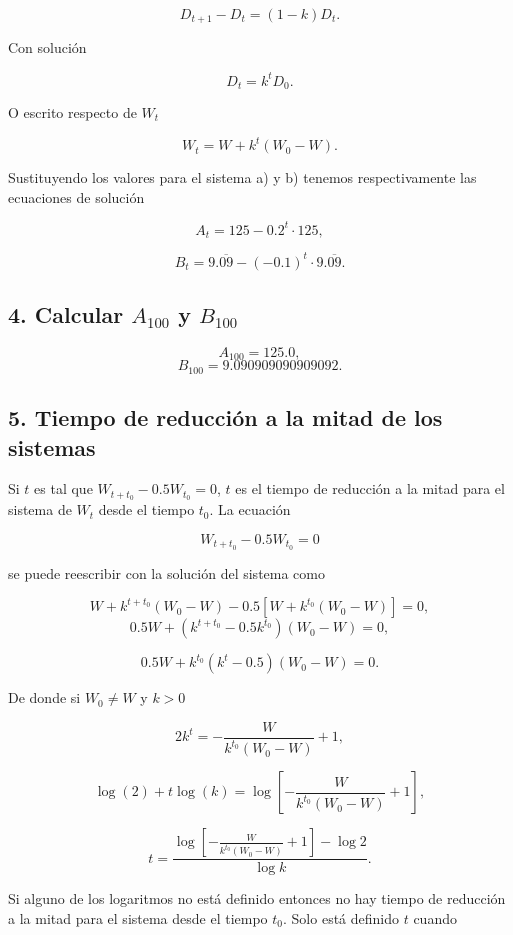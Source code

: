 \documentclass[11pt]{article}
\begin{document}
\[D_{t+1}-D_t = (1-k) D_t.\]

Con solución

\[D_t = k^t D_0.\]

O escrito respecto de \(W_t\)

\[W_t = W+ k^t (W_0-W).\]

    Sustituyendo los valores para el sistema a) y b) tenemos respectivamente
las ecuaciones de solución

\[A_t = 125- 0.2^t \cdot 125,\]

\[B_t = 9.\overline{09}- (-0.1)^t \cdot9.\overline{09}.\]

    \hypertarget{calcular-a_100-y-b_100}{%
\subsection*{\texorpdfstring{4. Calcular \(A_{100}\) y
\(B_{100}\)}{4. Calcular A\_\{100\} y B\_\{100\}}}\label{calcular-a_100-y-b_100}}

    \[A_{100} =125.0,\] \[B_{100} =9.090909090909092.\]

    \hypertarget{tiempo-de-reducciuxf3n-a-la-mitad-de-los-sistemas}{%
\subsection*{5. Tiempo de reducción a la mitad de los
sistemas}\label{tiempo-de-reducciuxf3n-a-la-mitad-de-los-sistemas}}

    Si \(t\) es tal que \(W_{t+t_0}-0.5 W_{t_0}=0\), \(t\) es el tiempo de
reducción a la mitad para el sistema de \(W_t\) desde el tiempo \(t_0\).
La ecuación

\[W_{t+t_0}-0.5 W_{t_0}=0\]

se puede reescribir con la solución del sistema como

\[W+ k^{t+t_0} (W_0-W) -0.5\left[W+ k^{t_0} (W_0-W)\right] = 0,\]
\[0.5W+(k^{t+t_0}-0.5k^{t_0}) (W_0-W)= 0,\]

\[0.5W+k^{t_0}(k^{t}-0.5) (W_0-W)= 0.\]

De donde si \(W_0\neq W\) y \(k> 0\)

\[2k^{t} = -\frac{W}{k^{t_0}(W_0-W)}+1,\]

    \[\log(2)+t \log(k) = \log\left[-\frac{W}{k^{t_0}(W_0-W)}+1\right],\]

    \[t= \frac{\log\left[-\frac{W}{k^{t_0}(W_0-W)}+1\right]-\log{2}}{\log{k}}.\]

    Si alguno de los logaritmos no está definido entonces no hay tiempo de
reducción a la mitad para el sistema desde el tiempo \(t_0\). Solo está
definido \(t\) cuando
\end{document}
